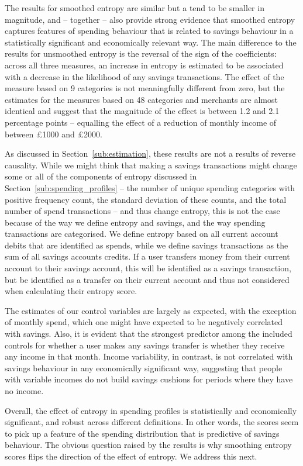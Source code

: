 The results for smoothed entropy are similar but a tend to be smaller in
magnitude, and -- together -- also provide strong evidence that smoothed
entropy captures features of spending behaviour that is related to savings
behaviour in a statistically significant and economically relevant way. The
main difference to the results for unsmoothed entropy is the reversal of the
sign of the coefficients: across all three measures, an increase in entropy is
estimated to be associated with a decrease in the likelihood of any savings
transactions. The effect of the measure based on 9 categories is not
meaningfully different from zero, but the estimates for the measures based on
48 categories and merchants are almost identical and suggest that the magnitude
of the effect is between 1.2 and 2.1 percentage points -- equalling the effect
of a reduction of monthly income of between \pounds1000 and \pounds2000.

As discussed in Section~\ref{sub:estimation}, these results are not a results
of reverse causality. While we might think that making a savings transactions
might change some or all of the components of entropy discussed in
Section~\ref{sub:spending_profiles} -- the number of unique spending categories
with positive frequency count, the standard deviation of these counts, and the
total number of spend transactions -- and thus change entropy, this is not the
case because of the way we define entropy and savings, and the way spending
transactions are categorised. We define entropy based on all current account
debits that are identified as spends, while we define savings transactions as
the sum of all savings accounts credits. If a user transfers money from their
current account to their savings account, this will be identified as a savings
transaction, but be identified as a transfer on their current account and thus
not considered when calculating their entropy score.

The estimates of our control variables are largely as expected, with the
exception of monthly spend, which one might have expected to be negatively
correlated with savings. Also, it is evident that the strongest predictor among
the included controls for whether a user makes any savings transfer is whether
they receive any income in that month. Income variability, in contrast, is not
correlated with savings behaviour in any economically significant way,
suggesting that people with variable incomes do not build savings cushions for
periods where they have no income.

Overall, the effect of entropy in spending profiles is statistically and
economically significant, and robust across different definitions. In other
words, the scores seem to pick up a feature of the spending distribution that
is predictive of savings behaviour. The obvious question raised by the results
is why smoothing entropy scores flips the direction of the effect of entropy.
We address this next.


